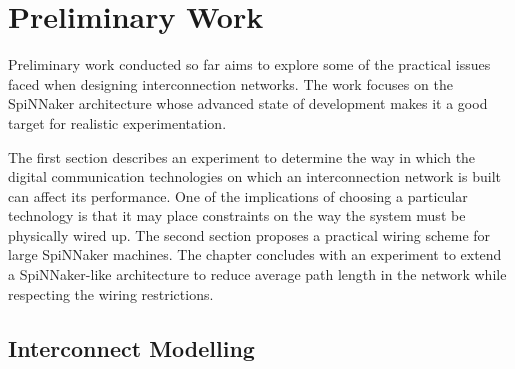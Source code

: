 \chapter{Preliminary Work}
	
	
	Preliminary work conducted so far aims to explore some of the practical issues
	faced when designing interconnection networks. The work focuses on the
	SpiNNaker architecture whose advanced state of development makes it a good
	target for realistic experimentation.
	
	The first section describes an experiment to determine the way in which the
	digital communication technologies on which an interconnection network is
	built can affect its performance. One of the implications of choosing a
	particular technology is that it may place constraints on the way the system
	must be physically wired up. The second section proposes a practical wiring
	scheme for large SpiNNaker machines. The chapter concludes with an experiment
	to extend a SpiNNaker-like architecture to reduce average path length in the
	network while respecting the wiring restrictions.
	
	
	\section{Interconnect Modelling}
		
